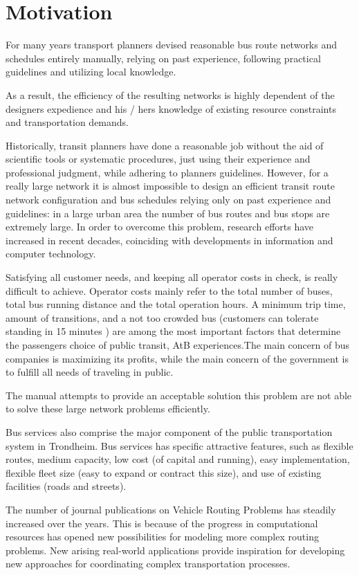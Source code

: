 \section{Motivation} 
 For many years transport planners devised reasonable bus route networks and schedules entirely manually, relying on past experience, following practical guidelines and utilizing local knowledge.

 As a result, the efficiency of the resulting networks is highly dependent of the designers expedience and his / hers knowledge of existing resource constraints and transportation demands. 

 Historically, transit planners have done a reasonable job without the aid of scientific tools or systematic procedures, just using their experience and professional judgment, while adhering to planners guidelines. However, for a really large network it is almost impossible to design an efficient transit route network configuration and bus schedules relying only on past experience and guidelines: in a large urban area the number of bus routes and bus stops are extremely large. In order to overcome this problem, research efforts have increased in recent decades, coinciding with developments in information and computer technology. 

 Satisfying all customer needs, and keeping all operator costs in check, is really difficult to achieve. Operator costs mainly refer to the total number of buses, total bus running distance and the total operation hours. A minimum trip time, amount of transitions, and a not too crowded bus (customers can tolerate standing in 15 minutes ) are among the most important factors that determine the passengers choice of public transit, AtB experiences.The main concern of bus companies is maximizing its profits, while the main concern of the government is to fulfill all needs of traveling in public. 

 The manual attempts to provide an acceptable solution this problem are not able to solve these large network problems efficiently.

 Bus services also comprise the major component of the public transportation system in Trondheim. Bus services has specific attractive features, such as flexible routes, medium capacity, low cost (of capital and running), easy implementation, flexible fleet size (easy to expand or contract this size), and use of existing facilities (roads and streets). 

 The number of journal publications on Vehicle Routing Problems has steadily increased over the years. This is because of the progress in computational resources has opened new possibilities for modeling more complex routing problems. New arising real-world applications provide inspiration for developing new approaches for coordinating complex transportation processes.  \citep{vehiclerouting}

